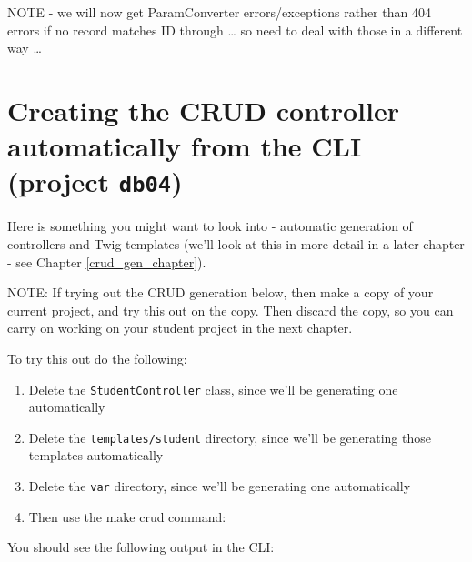 \documentclass[a4paperpaper,openright]{book}
\newenvironment{Shaded}{}{}
\newcommand{\ExtensionTok}[1]{#1}
\newcommand{\NormalTok}[1]{#1}
\begin{document}
NOTE - we will now get ParamConverter errors/exceptions rather than 404
errors if no record matches ID through \ldots{} so need to deal with
those in a different way \ldots{}

\hypertarget{creating-the-crud-controller-automatically-from-the-cli-project-db04}{%
\section{\texorpdfstring{Creating the CRUD controller automatically from
the CLI (project
\texttt{db04})}{Creating the CRUD controller automatically from the CLI (project db04)}}\label{creating-the-crud-controller-automatically-from-the-cli-project-db04}}

Here is something you might want to look into - automatic generation of
controllers and Twig templates (we'll look at this in more detail in a
later chapter - see Chapter \ref{crud_gen_chapter}).

NOTE: If trying out the CRUD generation below, then make a copy of your
current project, and try this out on the copy. Then discard the copy, so
you can carry on working on your student project in the next chapter.

To try this out do the following:

\begin{enumerate}
\def\labelenumi{\arabic{enumi}.}
\item
  Delete the \texttt{StudentController} class, since we'll be generating
  one automatically
\item
  Delete the \texttt{templates/student} directory, since we'll be
  generating those templates automatically
\item
  Delete the \texttt{var} directory, since we'll be generating one
  automatically
\item
  Then use the make crud command:

\begin{Shaded}
\end{Shaded}
\end{enumerate}

You should see the following output in the CLI:
\end{document}
